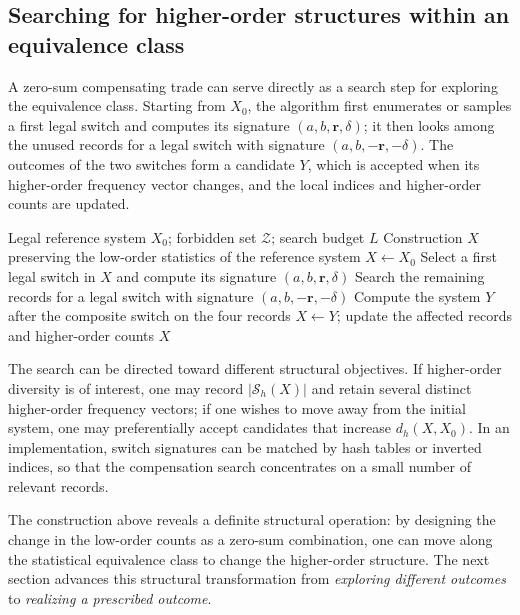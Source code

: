 \documentclass[11pt,a4paper]{article}
\numberwithin{equation}{section}
\theoremstyle{definition}
\numberwithin{algorithm}{section}
\begin{document}
\subsection{Searching for higher-order structures within an equivalence class}\label{subsec:variation-search}

A zero-sum compensating trade can serve directly as a search step for exploring the
equivalence class.
Starting from $X_0$, the algorithm first enumerates or samples a first legal switch and
computes its signature $(a,b,\boldsymbol r,\delta)$;
it then looks among the unused records for a legal switch with signature
$(a,b,-\boldsymbol r,-\delta)$.
The outcomes of the two switches form a candidate $Y$, which is accepted when its
higher-order frequency vector changes, and the local indices and higher-order counts are
updated.

\begin{algorithm}[H]
\small
\caption{Higher-order structure exploration within a second-order statistical equivalence class}
\label{alg:variation}
\begin{algorithmic}[1]
\Require Legal reference system $X_0$; forbidden set $\mathcal Z$; search budget $L$
\Ensure Construction $X$ preserving the low-order statistics of the reference system
\State $X\gets X_0$
  \State Select a first legal switch in $X$ and compute its signature $(a,b,\boldsymbol r,\delta)$
  \State Search the remaining records for a legal switch with signature $(a,b,-\boldsymbol r,-\delta)$
    \State Compute the system $Y$ after the composite switch on the four records
      \State $X\gets Y$; update the affected records and higher-order counts
    \EndIf
  \EndIf
\EndFor
\State \Return $X$
\end{algorithmic}
\end{algorithm}

The search can be directed toward different structural objectives.
If higher-order diversity is of interest, one may record $\lvert\mathcal S_h(X)\rvert$ and
retain several distinct higher-order frequency vectors;
if one wishes to move away from the initial system, one may preferentially accept candidates
that increase $d_h(X,X_0)$.
In an implementation, switch signatures can be matched by hash tables or inverted indices,
so that the compensation search concentrates on a small number of relevant records.

The construction above reveals a definite structural operation: by designing the change in
the low-order counts as a zero-sum combination, one can move along the statistical
equivalence class to change the higher-order structure.
The next section advances this structural transformation from \emph{exploring different
outcomes} to \emph{realizing a prescribed outcome}.
\end{document}
